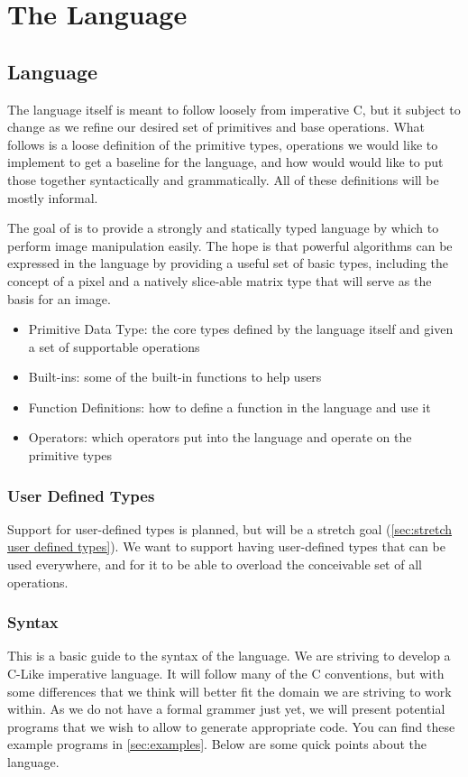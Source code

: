 \chapter{The \lepix{} Language}


\section{Language}
The language itself is meant to follow loosely from imperative C, but it subject to change as we refine our desired set of primitives and base operations. What follows is a loose definition of the primitive types, operations we would like to implement to get a baseline for the language, and how would would like to put those together syntactically and grammatically. All of these definitions will be mostly informal.

The goal of \lepix{} is to provide a strongly and statically typed language by which to perform image manipulation easily. The hope is that powerful algorithms can be expressed in the language by providing a useful set of basic types, including the concept of a pixel and a natively slice-able matrix type that will serve as the basis for an image.

\begin{itemize}
	\item Primitive Data Type: the core types defined by the language itself and given a set of supportable operations
	\item Built-ins: some of the built-in functions to help users  
	\item Function Definitions: how to define a function in the language and use it
	\item Operators: which operators put into the language and operate on the primitive types
\end{itemize}

\subsection{User Defined Types}
Support for user-defined types is planned, but will be a stretch goal (\ref{sec:stretch user defined types}). We want to support having user-defined types that can be used everywhere, and for it to be able to overload the conceivable set of all operations.

\subsection{Syntax}
This is a basic guide to the syntax of the language. We are striving to develop a C-Like imperative language. It will follow many of the C conventions, but with some differences that we think will better fit the domain we are striving to work within. As we do not have a formal grammer just yet, we will present potential programs that we wish to allow to generate appropriate code. You can find these example programs in \ref{sec:examples}. Below are some quick points about the \lepix{} language.

